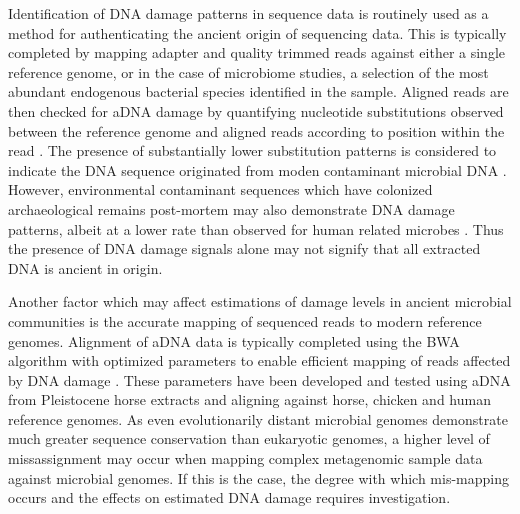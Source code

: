\documentclass[12pt, a4paper]{article}
\begin{document}
Identification of DNA damage patterns in sequence data is routinely used as a method for authenticating the ancient origin of sequencing data. 
This is typically completed by mapping adapter and quality trimmed reads against either a single reference genome, or in the case of microbiome studies, a selection of the most abundant endogenous bacterial species identified in the sample. 
Aligned reads are then checked for aDNA damage by quantifying nucleotide substitutions observed between the reference genome and aligned reads according to position within the read \cite{Lugli:2017aa,Weyrich:2017aa,Bos:2015aa}. 
The presence of substantially lower substitution patterns is considered to indicate the DNA sequence originated from moden contaminant microbial DNA \cite{Lugli:2017aa}.
However, environmental contaminant sequences which have colonized archaeological remains post-mortem may also demonstrate DNA damage patterns, albeit at a lower rate than observed for human related microbes \cite{Philips:2017aa}. 
Thus the presence of DNA damage signals alone may not signify that all extracted DNA is ancient in origin.

Another factor which may affect estimations of damage levels in ancient microbial communities is the accurate mapping of sequenced reads to modern reference genomes. 
Alignment of aDNA data is typically completed using the BWA algorithm with optimized parameters to enable efficient mapping of reads affected by DNA damage \cite{Schubert:2012aa}. 
These parameters have been developed and tested using aDNA from Pleistocene horse extracts and aligning against horse, chicken and human reference genomes. 
As even evolutionarily distant microbial genomes demonstrate much greater sequence conservation than eukaryotic genomes, a higher level of missassignment may occur when mapping complex metagenomic sample data against microbial genomes.
If this is the case, the degree with which mis-mapping occurs and the effects on estimated DNA damage requires investigation.
\end{document}
